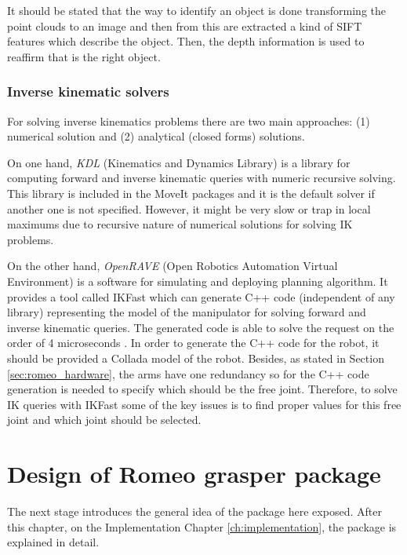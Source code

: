 \documentclass[12pt,a4paper,final,twoside,openright]{report}
\begin{document}
It should be stated that the way to identify an object is done transforming the point clouds to an image and then from this are extracted a kind of SIFT features which describe the object. Then, the depth information is used to reaffirm that is the right object.

\subsection{Inverse kinematic solvers}
\label{sec:inverse_kinematic}

For solving inverse kinematics problems there are two main approaches: (1) numerical solution and (2) analytical (closed forms) solutions. 

On one hand, \textit{KDL} (Kinematics and Dynamics Library)\citep{KDL} is a library for computing forward and inverse kinematic queries with numeric recursive solving. This library is included in the MoveIt packages and it is the default solver if another one is not specified. However, it might be very slow or trap in local maximums due to recursive nature of numerical solutions for solving IK problems. 

On the other hand, \textit{OpenRAVE} (Open Robotics Automation Virtual Environment)\cite{Diankov2010} is a software for simulating and deploying planning algorithm. It provides a tool called IKFast which can generate C++ code (independent of any library) representing the model of the manipulator for solving forward and inverse kinematic queries. The generated code is able  to solve the request on the order of 4 microseconds \cite{Diankov}. In order to generate the C++ code for the robot, it should be provided a Collada model \cite{KhronosGroup} of the robot. Besides, as stated in Section \ref{sec:romeo_hardware}, the arms have one redundancy so for the C++ code generation is needed to specify which should be the free joint. Therefore, to solve IK queries with IKFast some of the key issues is to find proper values for this free joint and which joint should be selected. 


\chapter{Design of Romeo grasper package}
\label{cha:design}

The next stage introduces the general idea of the package here exposed. After this chapter, on the Implementation Chapter \ref{ch:implementation}, the package is explained in detail. 
\end{document}
